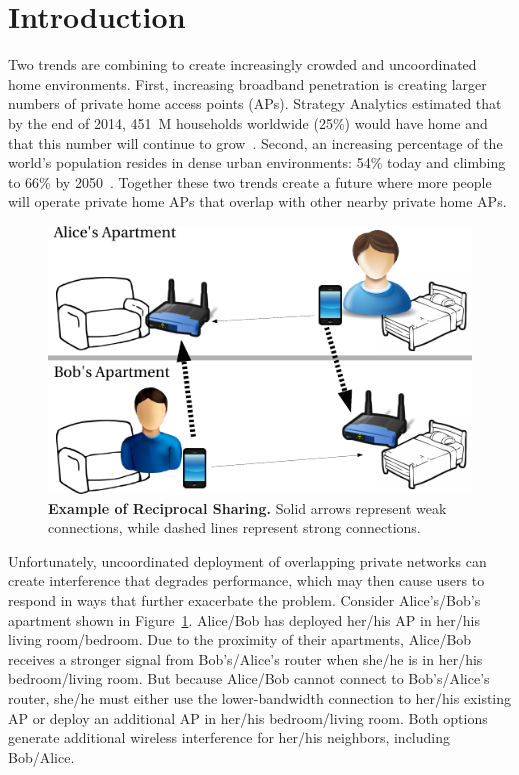 \section{Introduction}
\label{sec-introduction}

Two trends are combining to create increasingly crowded and uncoordinated
home \wifi{} environments. First, increasing broadband penetration is
creating larger numbers of private home access points (APs). Strategy
Analytics estimated that by the end of 2014, 451~M households worldwide
(25\%) would have home \wifi{} and that this number will continue to
grow~\cite{wifi-survey}. Second, an increasing percentage of the world's
population resides in dense urban environments: 54\% today and climbing to
66\% by 2050~\cite{urbanization-survey}. Together these two trends create a
future where more people will operate private home APs that overlap with
other nearby private home APs.

\begin{figure}[t]
  \centering
  \includegraphics[width=0.9\columnwidth]{./figures/motivation.pdf}
  \caption{\textbf{Example of Reciprocal \wifi{} Sharing.} Solid arrows
  represent weak connections, while dashed lines represent strong
  connections.}
  \label{fig:motivation}
  \vspace*{-0.1in}
\end{figure}

Unfortunately, uncoordinated deployment of overlapping private networks can
create interference that degrades performance, which may then cause users to
respond in ways that further exacerbate the problem. Consider Alice's/Bob's
apartment shown in Figure~\ref{fig:motivation}. Alice/Bob has deployed
her/his AP in her/his living room/bedroom. Due to the proximity of their
apartments, Alice/Bob receives a stronger signal from Bob's/Alice's router
when she/he is in her/his bedroom/living room. But because Alice/Bob cannot
connect to Bob's/Alice's router, she/he must either use the lower-bandwidth
connection to her/his existing AP or deploy an additional AP in her/his
bedroom/living room. Both options generate additional wireless interference
for her/his neighbors, including Bob/Alice.

